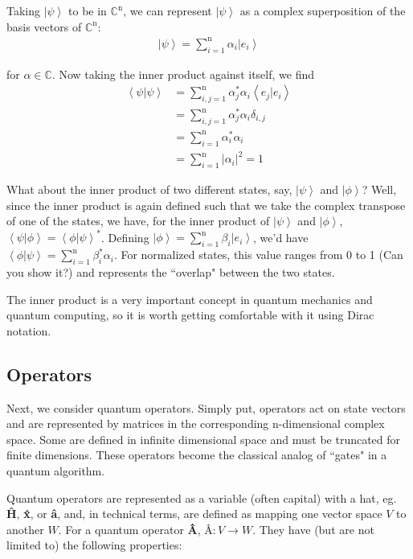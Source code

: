 \documentclass[11pt]{article} %
\newcommand{\ket}[1]{\left|#1\right\rangle}
\newcommand{\braket}[2]{\left\langle#1 |  #2\right\rangle}
\begin{document}
Taking $\ket{\psi}$ to be in $\mathbb{C}^\textrm{n}$, we can represent $\ket{\psi}$ as a complex superposition of the basis vectors of $\mathbb{C}^\textrm{n}$:
\begin{align}
    \ket{\psi} = \sum^\textrm{n}_{i=1}\alpha_i\ket{e_i} \nonumber
\end{align}

\noindent for $\alpha \in \mathbb{C}$. Now taking the inner product against itself, we find
\begin{align}
    \braket{\psi}{\psi} &= \sum^\textrm{n}_{i,j=1}\alpha_j^\ast\alpha_i\braket{e_j}{e_i}\nonumber\\
    &= \sum^\textrm{n}_{i,j=1}\alpha_j^\ast\alpha_i\delta_{i,j}\nonumber\\
    &= \sum^\textrm{n}_{i=1}\alpha_i^\ast\alpha_i\nonumber\\
    &= \sum^\textrm{n}_{i=1}\left|\alpha_i\right|^2 = 1\nonumber
\end{align}

What about the inner product of two different states, say, $\ket{\psi}$ and $\ket{\phi}$? Well, since the inner product is again defined such that we take the complex transpose of one of the states, we have, for the inner product of $\ket{\psi}$ and $\ket{\phi}$, $\braket{\psi}{\phi} = \braket{\phi}{\psi}^\ast$. Defining $\ket{\phi} = \sum^\textrm{n}_{i=1}\beta_i\ket{e_i}$, we'd have $\braket{\phi}{\psi} = \sum^\textrm{n}_{i=1}\beta_i^\ast\alpha_i$. For normalized states, this value ranges from 0 to 1 (Can you show it?) and represents the ``overlap" between the two states.

The inner product is a very important concept in quantum mechanics and quantum computing, so it is worth getting comfortable with it using Dirac notation.


\subsection{Operators} \label{operators}
Next, we consider quantum operators. Simply put, operators act on state vectors and are represented by matrices in the corresponding n-dimensional complex space. Some are defined in infinite dimensional space and must be truncated for finite dimensions. These operators become the classical analog of ``gates" in a quantum algorithm.

Quantum operators are represented as a variable (often capital) with a hat, eg. \textbf{\^{H}}, \textbf{\^{x}}, or \textbf{\^{a}}, and, in technical terms, are defined as mapping one vector space $V$ to another $W$. For a quantum operator \textbf{\^{A}}, $\textbf{\^{A}}: V \rightarrow W$. They have (but are not limited to) the following properties:
\end{document}
